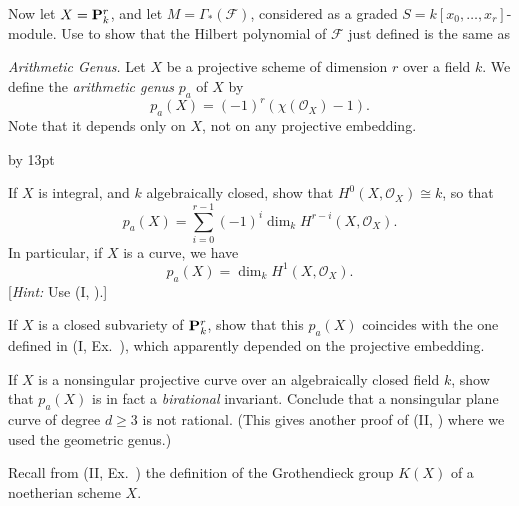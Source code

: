 {{{\noindent\hypertarget{ex-III-5.2b}{}Now let $X=\mathbf{P}_k^r$, and let $M=\Gamma_*(\mathcal F)$, considered as a graded $S=k[x_0,\ldots,x_r]$-module. Use  to show that the Hilbert polynomial of $\mathcal F$ just defined is the same as
\par}

\smallskip
\noindent\hypertarget{ex-III-5.3}{}\emph{Arithmetic Genus.} Let $X$ be a projective scheme of dimension $r$ over a field $k$. We define the \emph{arithmetic genus} $p_a$ of $X$ by
\[
p_a(X)=(-1)^r(\chi(\mathcal O_X)-1).
\]
Note that it depends only on $X$, not on any projective embedding.
{\advance\leftskip by 13pt\par
\noindent\hypertarget{ex-III-5.3a}{}If $X$ is integral, and $k$ algebraically closed, show that $H^0(X,\mathcal O_X)\cong k$, so that
\[
p_a(X)=\sum_{i=0}^{r-1}(-1)^i\dim_kH^{r-i}(X,\mathcal O_X).
\]
In particular, if $X$ is a curve, we have
\[
p_a(X)=\dim_kH^1(X,\mathcal O_X).
\]
[\emph{Hint:} Use (I, ).]

\noindent\hypertarget{ex-III-5.3b}{}If $X$ is a closed subvariety of $\mathbf{P}_k^r$, show that this $p_a(X)$ coincides with the one defined in (I, Ex.~), which apparently depended on the projective embedding.

\noindent\hypertarget{ex-III-5.3c}{}If $X$ is a nonsingular projective curve over an algebraically closed field $k$, show that $p_a(X)$ is in fact a \emph{birational} invariant. Conclude that a nonsingular plane curve of degree $d\geq3$ is not rational. (This gives another proof of (II, ) where we used the geometric genus.)\par}

\smallskip
\noindent\hypertarget{ex-III-5.4}{}Recall from (II, Ex.~) the definition of the Grothendieck group $K(X)$ of a noetherian scheme $X$.\par}
}
